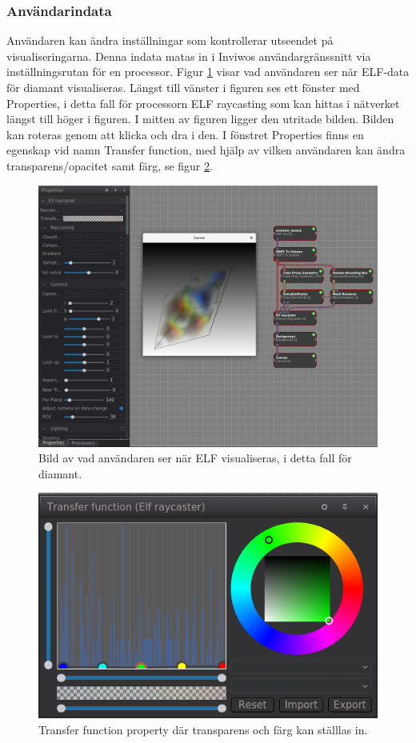 \documentclass[a4paper,12pt,twoside,openright]{report}
\begin{document}
\subsubsection{Användarindata}
Användaren kan ändra inställningar som kontrollerar utseendet på visualiseringarna.
Denna indata matas in i Inviwos användargränssnitt via inställningsrutan för en processor. Figur \ref{fig:interface} visar vad användaren ser när ELF-data för diamant visualiseras. Längst till vänster i figuren ses ett fönster med Properties, i detta fall för processorn ELF raycasting som kan hittas i nätverket längst till höger i figuren. I mitten av figuren ligger den utritade bilden. Bilden kan roteras genom att klicka och dra i den. I fönstret Properties finns en egenskap vid namn Transfer function, med hjälp av vilken användaren kan ändra transparens/opacitet samt färg, se figur \ref{fig:transferfunction}.

\begin{figure}[H]
	\centering
	\includegraphics[scale=0.3]{inviwo_interface_elf.png}
	\caption{Bild av vad användaren ser när ELF visualiseras, i detta fall för diamant.}
	\label{fig:interface}
\end{figure}

\begin{figure}[H]
	\centering
	\includegraphics[scale=0.55]{transferfunction_elf.png}
	\caption{Transfer function property där transparens och färg kan ställlas in.}
	\label{fig:transferfunction}
\end{figure}
\end{document}
